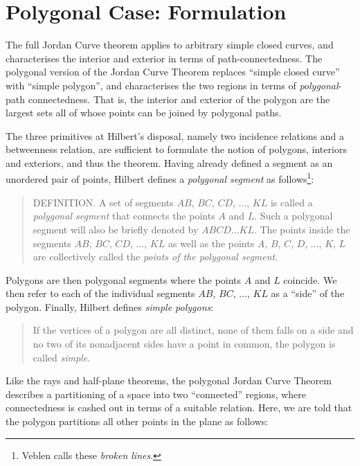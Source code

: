 \section{Polygonal Case: Formulation}\label{sec:JordanCurveExplanation}
The full Jordan Curve theorem applies to arbitrary simple closed curves, and characterises the interior and exterior in terms of path-connectedness. The polygonal version of the Jordan Curve Theorem replaces ``simple closed curve'' with ``simple polygon'', and characterises the two regions in terms of \emph{polygonal}-path connectedness. That is, the interior and exterior of the polygon are the largest sets all of whose points can be joined by polygonal paths. 

The three primitives at Hilbert's disposal, namely two incidence relations and a betweenness relation, are sufficient to formulate the notion of polygons, interiors and exteriors, and thus the theorem. Having already defined a segment as an unordered pair of points, Hilbert defines a \emph{polygonal segment} as follows\footnote{Veblen calls these \emph{broken lines}.}:

\begin{quote}
DEFINITION. A set of segments $AB$, $BC$, $CD$, $\ldots$, $KL$ is called a \emph{polygonal segment} that connects the points $A$ and $L$. Such a polygonal segment will also be briefly denoted by $ABCD\ldots KL$. The points inside the segments $AB$, $BC$, $CD$, $\ldots$, $KL$ as well as the points $A$, $B$, $C$, $D$, $\ldots$, $K$, $L$ are collectively called the \emph{points of the polygonal segment}. 
\end{quote}

Polygons are then polygonal segments where the points $A$ and $L$ coincide. We then refer to each of the individual segments $AB$, $BC$, $\ldots$, $KL$ as a ``side'' of the polygon. Finally, Hilbert defines \emph{simple polygons}:

\begin{quote}
If the vertices of a polygon are all distinct, none of them falls on a side and no two of its nonadjacent sides have a point in common, the polygon is called \emph{simple}.
\end{quote}

Like the rays and half-plane theorems, the polygonal Jordan Curve Theorem describes a partitioning of a space into two ``connected'' regions, where connectedness is cashed out in terms of a suitable relation. Here, we are told that the polygon partitions all other points in the plane as follows:

